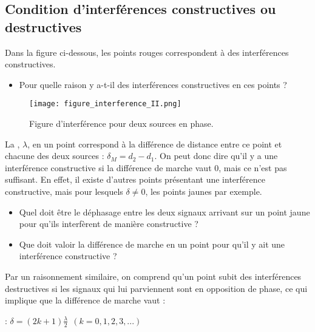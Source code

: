 \newpage

\subsection{Condition d'interférences constructives ou destructives}
Dans la figure ci-dessous, les points rouges correspondent à des interférences constructives.
\begin{itemize}[label=\textbullet]
    \item Pour quelle raison y a-t-il des interférences constructives en ces points ?
\end{itemize}

\begin{figure}[h]
    \centering
    \texttt{[image: figure\_interference\_II.png]}
    \caption{Figure d'interférence pour deux sources en phase.}
\end{figure}

La , \(\lambda\), en un point correspond à la différence de distance entre ce point et chacune des deux sources : \(\delta _M=d_2 - d_1\). On peut donc dire qu'il y a une interférence constructive si la différence de marche vaut 0, mais ce n'est pas suffisant. En effet, il existe d'autres points présentant une interférence constructive, mais pour lesquels \(\delta \neq 0\), les points jaunes par exemple.

\newpage

\begin{itemize}[label=\textbullet]
    \item Quel doit être le déphasage entre les deux signaux arrivant sur un point jaune pour qu'ils interfèrent de manière constructive ?
    \item Que doit valoir la différence de marche en un point pour qu'il y ait une interférence constructive ?
\end{itemize}



Par un raisonnement similaire, on comprend qu'un point subit des interférences destructives si les signaux qui lui parviennent sont en opposition de phase, ce qui implique que la différence de marche vaut :

\begin{encadre}
     : \(\delta = (2k+1) \frac{\lambda}{2} \ \ (k=0,1,2,3,...)\)
\end{encadre}

